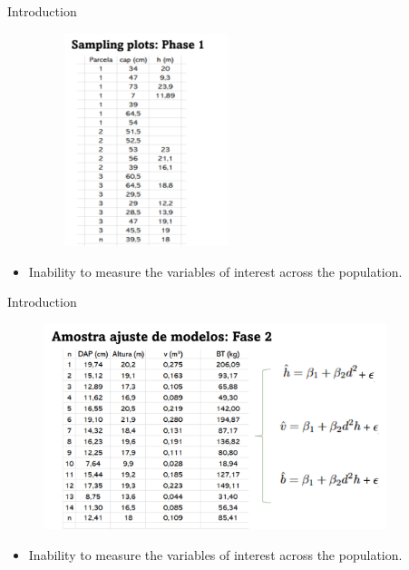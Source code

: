 \documentclass{beamer}
\begin{document}
\begin{frame}{Introduction}
\begin{figure}
        \centering
        \includegraphics[width = 6cm, height = 6.2cm]{pic/imagem 3.jpg}
        \end{figure}
\begin{itemize}
    \item Inability to measure the variables of interest across the population.
\end{itemize}
\end{frame}

\begin{frame}{Introduction}
\begin{figure}
        \centering
        \includegraphics[width = 10cm, height = 6cm]{Imagem4.jpg}
        \end{figure}
\begin{itemize}
    \item Inability to measure the variables of interest across the population.
\end{itemize}
\end{frame}
\end{document}
